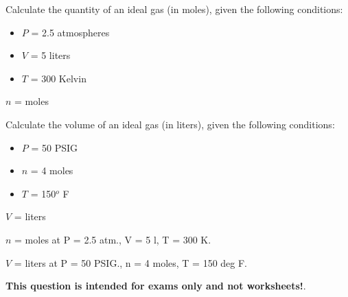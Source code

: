 

Calculate the quantity of an ideal gas (in moles), given the following conditions:

\begin{itemize}
\item{} $P$ = 2.5 atmospheres
\item{} $V$ = 5 liters
\item{} $T$ = 300 Kelvin
\end{itemize}

$n$ = \underbar{\hskip 50pt} moles

\vskip 100pt

Calculate the volume of an ideal gas (in liters), given the following conditions:

\begin{itemize}
\item{} $P$ = 50 PSIG
\item{} $n$ = 4 moles
\item{} $T$ = 150$^{o}$ F
\end{itemize}

$V$ = \underbar{\hskip 50pt} liters








$n$ =  moles at P = 2.5 atm., V = 5 l, T = 300 K.

\vskip 10pt

$V$ =  liters at P = 50 PSIG., n = 4 moles, T = 150 deg F.







{\bf This question is intended for exams only and not worksheets!}.



